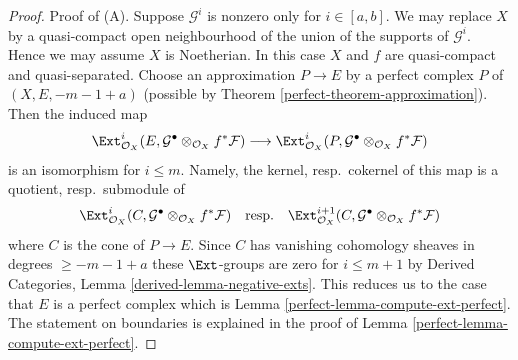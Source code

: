 \begin{proof}

Proof of (A).
Suppose $\mathcal{G}^i$ is nonzero only for $i \in [a, b]$.
We may replace $X$ by a quasi-compact open neighbourhood of
the union of the supports of $\mathcal{G}^i$.
Hence we may assume $X$ is Noetherian.
In this case $X$ and $f$ are quasi-compact and quasi-separated.
Choose an approximation $P \to E$ by a perfect complex $P$ of
$(X, E, -m - 1 + a)$
(possible by Theorem \ref{perfect-theorem-approximation}).
Then the induced map
$$
\Ext^i_{\mathcal{O}_X}(E,
\mathcal{G}^\bullet \otimes_{\mathcal{O}_X} f^*\mathcal{F})
\longrightarrow
\Ext^i_{\mathcal{O}_X}(P,
\mathcal{G}^\bullet \otimes_{\mathcal{O}_X} f^*\mathcal{F})
$$
is an isomorphism for $i \leq m$. Namely, the kernel, resp.\ cokernel of this
map is a quotient, resp.\ submodule of
$$
\Ext^i_{\mathcal{O}_X}(C,
\mathcal{G}^\bullet \otimes_{\mathcal{O}_X} f^*\mathcal{F})
\quad\text{resp.}\quad
\Ext^{i + 1}_{\mathcal{O}_X}(C,
\mathcal{G}^\bullet \otimes_{\mathcal{O}_X} f^*\mathcal{F})
$$
where $C$ is the cone of $P \to E$. Since $C$ has vanishing cohomology
sheaves in degrees $\geq -m - 1 + a$ these $\Ext$-groups are zero
for $i \leq m + 1$ by
Derived Categories, Lemma \ref{derived-lemma-negative-exts}.
This reduces us to the case that
$E$ is a perfect complex which is Lemma \ref{perfect-lemma-compute-ext-perfect}.
The statement on boundaries is explained in the proof of
Lemma \ref{perfect-lemma-compute-ext-perfect}.


\end{proof}
